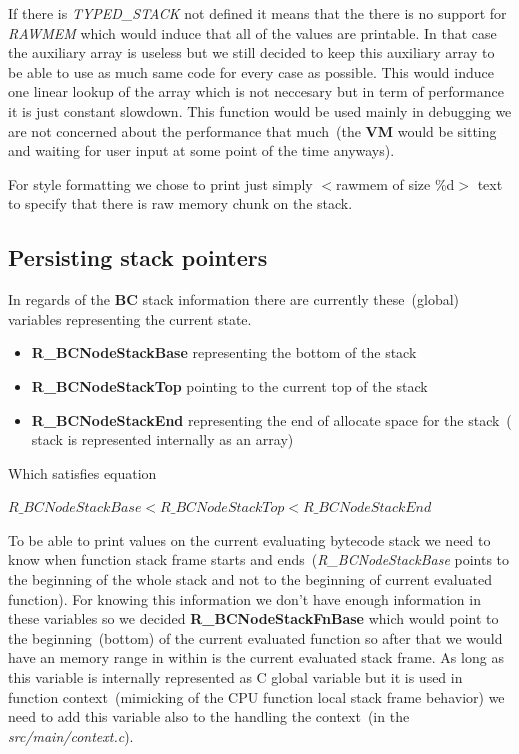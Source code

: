 \documentclass[thesis=M,english]{FITthesis}[2018/10/20]
\begin{document}
If there is \textit{TYPED{\_}STACK} not defined it means that the there is no support for \textit{RAWMEM} which would induce that all of the values are printable. In that case the auxiliary array is useless but we still decided to keep this auxiliary array to be able to use as much same code for every case as possible. This would induce one linear lookup of the array which is not neccesary but in term of performance it is just constant slowdown. This function would be used mainly in debugging we are not concerned about the performance that much~(the \textbf{VM} would be sitting and waiting for user input at some point of the time anyways).

For style formatting we chose to print just simply $<$rawmem of size \%d$>$ text to specify that there is raw memory chunk on the stack.

\subsection{Persisting stack pointers}\label{printing-stack-values}

In regards of the \textbf{BC} stack information there are currently these~(global) variables representing the current state.
 
\begin{itemize}
\item \textbf{R{\_}BCNodeStackBase} representing the bottom of the stack
	\item \textbf{R{\_}BCNodeStackTop} pointing to the current top of the stack
	\item \textbf{R{\_}BCNodeStackEnd} representing the end of allocate space for the stack~( stack is represented internally as an array)
\end{itemize}

Which satisfies equation 

$R{\_}BCNodeStackBase < R{\_}BCNodeStackTop < R{\_}BCNodeStackEnd$

To be able to print values on the current evaluating bytecode stack we need to know when function stack frame starts and ends~(\textit{R{\_}BCNodeStackBase} points to the beginning of the whole stack and not to the beginning of current evaluated function). For knowing this information we don't have enough information in these variables so we decided \textbf{R{\_}BCNodeStackFnBase} which would point to the beginning~(bottom) of the current evaluated function so after that we would have an memory range in within is the current evaluated stack frame. As long as this variable is internally represented as C global variable but it is used in function context~(mimicking of the CPU function local stack frame behavior) we need to add this variable also to the handling the context~(in the \textit{src/main/context.c}).
\end{document}
